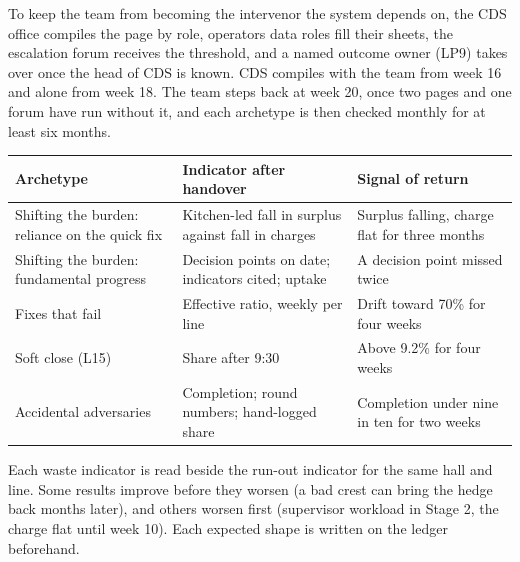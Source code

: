 \documentclass[
  10pt,
  table]{article}
\newcounter{none} %
\begin{document}
To keep the team from becoming the intervenor the system depends on, the CDS office compiles the page by role, operators\textquotesingle{} data roles fill their sheets, the escalation forum receives the threshold, and a named outcome owner (LP9) takes over once the head of CDS is known. CDS compiles with the team from week 16 and alone from week 18. The team steps back at week 20, once two pages and one forum have run without it, and each archetype is then checked monthly for at least six months.

{\def\LTcaptype{none} %
\begin{longtable}[]{@{}
  >{\raggedright\arraybackslash}p{}
  >{\raggedright\arraybackslash}p{}
  >{\raggedright\arraybackslash}p{}@{}}
\toprule\noalign{}
\begin{minipage}[b]{\linewidth}\raggedright
\cellcolor{pblue}\color{white}\bfseries Archetype
\end{minipage} & \begin{minipage}[b]{\linewidth}\raggedright
\cellcolor{pblue}\color{white}\bfseries Indicator after handover
\end{minipage} & \begin{minipage}[b]{\linewidth}\raggedright
\cellcolor{pblue}\color{white}\bfseries Signal of return
\end{minipage} \\
\midrule\noalign{}
\endhead
\bottomrule\noalign{}
\endlastfoot
Shifting the burden: reliance on the quick fix & Kitchen-led fall in surplus against fall in charges & Surplus falling, charge flat for three months \\
Shifting the burden: fundamental progress & Decision points on date; indicators cited; uptake & A decision point missed twice \\
Fixes that fail & Effective ratio, weekly per line & Drift toward 70\% for four weeks \\
Soft close (L15) & Share after 9:30 & Above 9.2\% for four weeks \\
Accidental adversaries & Completion; round numbers; hand-logged share & Completion under nine in ten for two weeks \\
\end{longtable}
}

Each waste indicator is read beside the run-out indicator for the same hall and line. Some results improve before they worsen (a bad crest can bring the hedge back months later), and others worsen first (supervisor workload in Stage 2, the charge flat until week 10). Each expected shape is written on the ledger beforehand.
\end{document}
